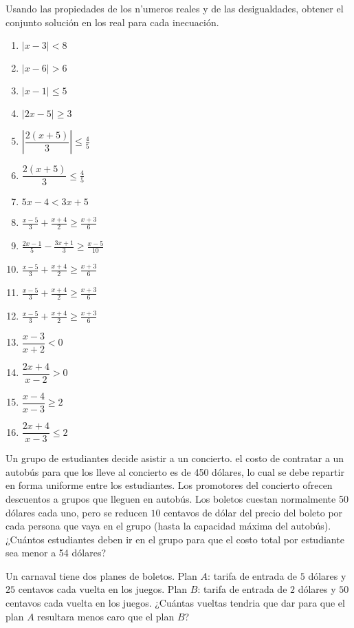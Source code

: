 \documentclass[]{book}
\theoremstyle{definition}
\theoremstyle{definition}
\theoremstyle{definition}
\theoremstyle{remark}
\begin{document}
Usando las propiedades de los n'umeros reales y de las desigualdades, obtener el conjunto solución en los real para cada inecuación.

\begin{enumerate}
	\item {\Large $\mid x-3\mid<8$}
	\item {\Large $\mid x-6\mid>6$}
	\item {\Large $\mid x-1\mid \leq 5$}
	\item {\Large $\mid2x-5\mid \geq 3$}
	\item $\left|  \dfrac{2(x+5)}{3} \right|  \leq \frac{4}{5}$
	\item {\Large $\dfrac{2(x+5)}{3}\leq \frac{4}{5}$}
	\item {\Large $5x-4<3x+5$}
	\item {\Large $\frac{x-5}{3}+\frac{x+4}{2}\geq \frac{x+3}{6}$}
	\item {\Large $\frac{2x-1}{5}-\frac{3x+1}{3}\geq \frac{x-5}{10}$}
	\item {\Large $\frac{x-5}{3}+\frac{x+4}{2}\geq \frac{x+3}{6}$}
	\item {\Large $\frac{x-5}{3}+\frac{x+4}{2}\geq \frac{x+3}{6}$}
	\item {\Large $\frac{x-5}{3}+\frac{x+4}{2}\geq \frac{x+3}{6}$}
	\item {\Large $\dfrac{x-3}{x+2} < 0$}
	\item {\Large $\dfrac{2x+4}{x-2} > 0$}
	\item {\Large $\dfrac{x-4}{x-3}\geq 2$}
	\item {\Large $\dfrac{2x+4}{x-3}\leq 2$}
\end{enumerate}

Un grupo de estudiantes decide asistir a un concierto. el costo de contratar a un autobús para que los lleve al concierto es de 450 dólares, lo cual se debe repartir en forma uniforme entre los estudiantes. Los promotores del concierto ofrecen descuentos a grupos que lleguen en autobús. Los boletos cuestan normalmente 50 dólares cada uno, pero se reducen \(10\) centavos de dólar del precio del boleto por cada persona que vaya en el grupo (hasta la capacidad máxima del autobús).¿Cuántos estudiantes deben ir en el grupo para que el costo total por estudiante sea menor a 54 dólares?

Un carnaval tiene dos planes de boletos.
Plan \(A\): tarifa de entrada de \(5\) dólares y \(25\) centavos cada vuelta en los juegos.
Plan \(B\): tarifa de entrada de \(2\) dólares y \(50\) centavos cada vuelta en los juegos.
¿Cuántas vueltas tendria que dar para que el plan \(A\) resultara menos caro que el plan \(B\)?
\end{document}
